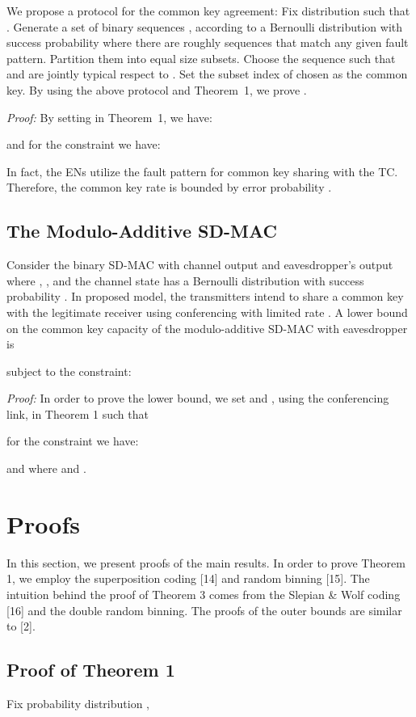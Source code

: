\documentclass[conference,8pt]{IEEEtran}
\begin{document}
{{We propose a protocol for the common key agreement: Fix distribution  such that . Generate a set of  binary sequences ,  according to a Bernoulli distribution with success probability  where there are roughly  sequences  that match any given fault pattern. Partition them into  equal size subsets. Choose the sequence  such that  and  are jointly typical respect to . Set the subset index of chosen  as the common key. By using the above protocol and Theorem~1, we prove .

\emph{Proof:} By setting  in Theorem~1, we have:

and for the constraint we have:

In fact, the ENs utilize the fault pattern for  common key sharing with the TC. Therefore, the common key rate is bounded by error probability .

\subsection{The Modulo-Additive SD-MAC}
Consider the binary SD-MAC with channel output  and eavesdropper's output  where , ,  and the channel state  has a Bernoulli distribution with success probability . In proposed model, the transmitters intend to share a common key  with the legitimate receiver  using conferencing with limited rate . A lower bound on the common key capacity of the modulo-additive SD-MAC with eavesdropper is 

subject to the constraint:


\emph{Proof:} In order to prove the lower bound, we set  and , using the conferencing link, in Theorem 1 such that

for the constraint we have:

and
where  and .

\section{Proofs}{
In this section, we present proofs of the main results. In order to prove Theorem 1, we employ the superposition coding [14] and random binning [15]. The intuition behind the proof of Theorem 3 comes from the Slepian \& Wolf coding [16] and the double random binning. The proofs of the outer bounds are similar to [2]. 

\subsection{Proof of Theorem 1}\label{sec:sec51}{
Fix probability distribution ,

}}}}
\end{document}
